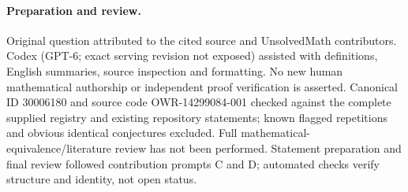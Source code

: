 \documentclass[11pt]{article}
\begin{document}
\paragraph{Preparation and review.}
Original question attributed to the cited source and UnsolvedMath contributors. Codex (GPT-6; exact serving revision not exposed) assisted with definitions, English summaries, source inspection and formatting. No new human mathematical authorship or independent proof verification is asserted. Canonical ID 30006180 and source code OWR-14299084-001 checked against the complete supplied registry and existing repository statements; known flagged repetitions and obvious identical conjectures excluded. Full mathematical-equivalence/literature review has not been performed. Statement preparation and final review followed contribution prompts C and D; automated checks verify structure and identity, not open status.
\label{end:30006180}
\end{document}
